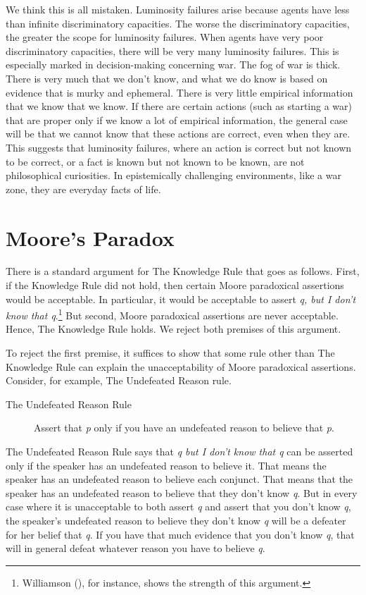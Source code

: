 \documentclass[
  11pt,
  letterpaper,
  DIV=11,
  numbers=noendperiod,
  twoside]{scrartcl}
\begin{document}
We think this is all mistaken. Luminosity failures arise because agents
have less than infinite discriminatory capacities. The worse the
discriminatory capacities, the greater the scope for luminosity
failures. When agents have very poor discriminatory capacities, there
will be very many luminosity failures. This is especially marked in
decision-making concerning war. The fog of war is thick. There is very
much that we don't know, and what we do know is based on evidence that
is murky and ephemeral. There is very little empirical information that
we know that we know. If there are certain actions (such as starting a
war) that are proper only if we know a lot of empirical information, the
general case will be that we cannot know that these actions are correct,
even when they are. This suggests that luminosity failures, where an
action is correct but not known to be correct, or a fact is known but
not known to be known, are not philosophical curiosities. In
epistemically challenging environments, like a war zone, they are
everyday facts of life.

\section{Moore's Paradox}\label{moores-paradox}

There is a standard argument for The Knowledge Rule that goes as
follows. First, if the Knowledge Rule did not hold, then certain Moore
paradoxical assertions would be acceptable. In particular, it would be
acceptable to assert \emph{q, but I don't know that q}.\footnote{Williamson
  (), for instance, shows the
  strength of this argument.} But second, Moore paradoxical assertions
are never acceptable. Hence, The Knowledge Rule holds. We reject both
premises of this argument.

To reject the first premise, it suffices to show that some rule other
than The Knowledge Rule can explain the unacceptability of Moore
paradoxical assertions. Consider, for example, The Undefeated Reason
rule.

\begin{description}
\item[The Undefeated Reason Rule]
Assert that \emph{p} only if you have an undefeated reason to believe
that \emph{p}.
\end{description}

The Undefeated Reason Rule says that \emph{q but I don't know that q}
can be asserted only if the speaker has an undefeated reason to believe
it. That means the speaker has an undefeated reason to believe each
conjunct. That means that the speaker has an undefeated reason to
believe that they don't know \emph{q}. But in every case where it is
unacceptable to both assert \emph{q} and assert that you don't know
\emph{q}, the speaker's undefeated reason to believe they don't know
\emph{q} will be a defeater for her belief that \emph{q}. If you have
that much evidence that you don't know \emph{q}, that will in general
defeat whatever reason you have to believe \emph{q}.
\end{document}
